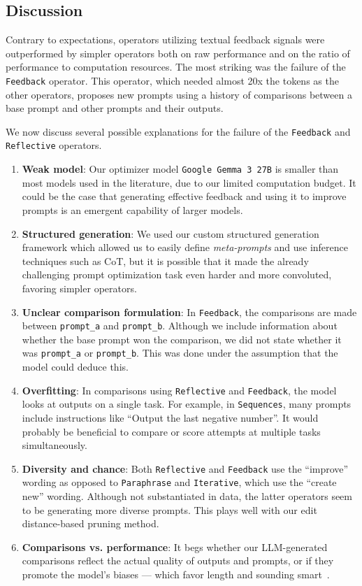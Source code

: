 \subsection{Discussion}

Contrary to expectations, operators utilizing textual feedback signals were outperformed by simpler operators
both on raw performance and on the ratio of performance to computation resources.
The most striking was the failure of the \texttt{Feedback} operator. This operator, which needed almost 20x the tokens as the other operators,
proposes new prompts using a history of comparisons between a base prompt and other prompts and their outputs. 

We now discuss several possible explanations for the failure of the \texttt{Feedback} and \texttt{Reflective} operators.
\begin{enumerate}
    \item \textbf{Weak model}: Our optimizer model \texttt{Google Gemma 3 27B} is smaller than most models used in the literature, due to our limited computation budget. It could be the case that generating effective feedback and using it to improve prompts is an emergent capability of larger models.
    \item \textbf{Structured generation}: We used our custom structured generation framework which allowed us to easily define \textit{meta-prompts} and use inference techniques such as CoT, but it is possible that it made the already challenging prompt optimization task even harder and more convoluted, favoring simpler operators.
    \item \textbf{Unclear comparison formulation}: In \texttt{Feedback}, the comparisons are made between \texttt{prompt\_a} and \texttt{prompt\_b}. Although we include information about whether the base prompt won the comparison, we did not state whether it was \texttt{prompt\_a} or \texttt{prompt\_b}. This was done under the assumption that the model could deduce this.
    \item \textbf{Overfitting}: In comparisons using \texttt{Reflective} and \texttt{Feedback}, the model looks at outputs on a single task. For example, in \texttt{Sequences}, many prompts include instructions like ``Output the last negative number''. It would probably be beneficial to compare or score attempts at multiple tasks simultaneously.
    \item \textbf{Diversity and chance}: Both \texttt{Reflective} and \texttt{Feedback} use the ``improve'' wording as opposed to \texttt{Paraphrase} and \texttt{Iterative}, which use the ``create new'' wording. Although not substantiated in data, the latter operators seem to be generating more diverse prompts. This plays well with our edit distance-based pruning method.
    \item \textbf{Comparisons vs. performance}: It begs whether our LLM-generated comparisons reflect the actual quality of outputs and prompts, or if they promote the model's biases — which favor length and sounding smart~\cite{ye2024justiceprejudicequantifyingbiases}.
\end{enumerate}

